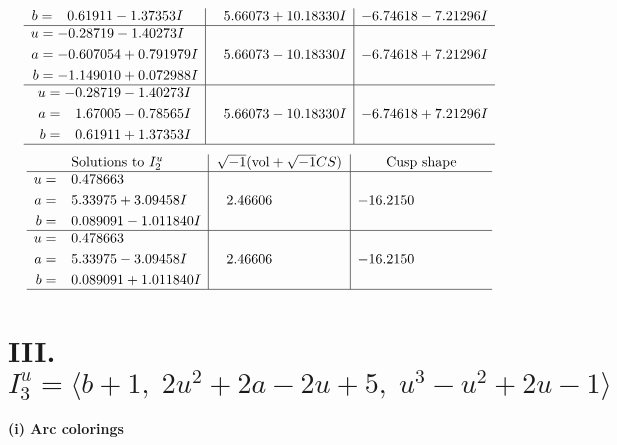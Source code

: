 \documentclass[1p]{elsarticle_modified}
\theoremstyle{definition}
\newcommand{\I}{\sqrt{-1}}
\begin{document}
$$\begin{array}{c|c|c}
\begin{aligned}
b &= \phantom{-}0.61911 - 1.37353 I\end{aligned}
 & \phantom{-}5.66073 + 10.18330 I & -6.74618 - 7.21296 I \\ \hline\begin{aligned}
u &= -0.28719 - 1.40273 I \\
a &= -0.607054 + 0.791979 I \\
b &= -1.149010 + 0.072988 I\end{aligned}
 & \phantom{-}5.66073 - 10.18330 I & -6.74618 + 7.21296 I \\ \hline\begin{aligned}
u &= -0.28719 - 1.40273 I \\
a &= \phantom{-}1.67005 - 0.78565 I \\
b &= \phantom{-}0.61911 + 1.37353 I\end{aligned}
 & \phantom{-}5.66073 - 10.18330 I & -6.74618 + 7.21296 I\\
 \hline 
 \end{array}$$\newpage$$\begin{array}{c|c|c}  
\text{Solutions to }I^u_{2}& \I (\text{vol} + \sqrt{-1}CS) & \text{Cusp shape}\\
 \hline 
\begin{aligned}
u &= \phantom{-}0.478663\phantom{ +0.000000I} \\
a &= \phantom{-}5.33975 + 3.09458 I \\
b &= \phantom{-}0.089091 - 1.011840 I\end{aligned}
 & \phantom{-}2.46606\phantom{ +0.000000I} & -16.2150\phantom{ +0.000000I} \\ \hline\begin{aligned}
u &= \phantom{-}0.478663\phantom{ +0.000000I} \\
a &= \phantom{-}5.33975 - 3.09458 I \\
b &= \phantom{-}0.089091 + 1.011840 I\end{aligned}
 & \phantom{-}2.46606\phantom{ +0.000000I} & -16.2150\phantom{ +0.000000I}\\
 \hline 
 \end{array}$$\newpage\newpage\renewcommand{\arraystretch}{1}
\centering \section*{III. $I^u_{3}= \langle b+1,\;2 u^2+2 a-2 u+5,\;u^3- u^2+2 u-1 \rangle$}
\flushleft \textbf{(i) Arc colorings}\\
\end{document}
